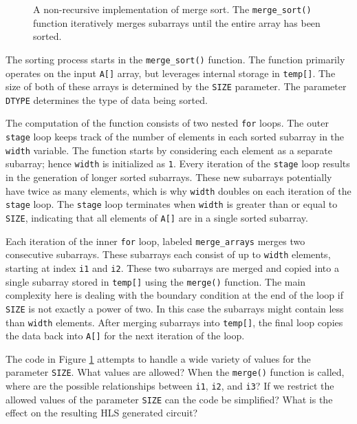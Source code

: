 \begin{figure}

\caption{  A non-recursive implementation of merge sort. The \lstinline{merge_sort()} function iteratively merges subarrays until the entire array has been sorted. }
\label{fig:merge_sort.cpp}
\end{figure}

The sorting process starts in the \lstinline{merge_sort()} function. The function primarily operates on the input \lstinline{A[]} array, but leverages internal storage in \lstinline{temp[]}. The size of both of these arrays is determined by the \lstinline{SIZE} parameter. The parameter \lstinline{DTYPE} determines the type of data being sorted.

The computation of the function consists of two nested \lstinline{for} loops. The outer \lstinline{stage} loop keeps track of the number of elements in each sorted subarray in the \lstinline{width} variable. The function starts by considering each element as a separate subarray; hence \lstinline{width} is initialized as \lstinline{1}. Every iteration of the \lstinline{stage} loop results in the generation of longer sorted subarrays. These new subarrays potentially have twice as many elements, which is why \lstinline{width} doubles on each iteration of the \lstinline{stage} loop. The \lstinline{stage} loop terminates when \lstinline{width} is greater than or equal to \lstinline{SIZE}, indicating that all elements of \lstinline{A[]} are in a single sorted subarray.

Each iteration of the inner \lstinline{for} loop, labeled \lstinline{merge_arrays} merges two consecutive subarrays. These subarrays each consist of up to \lstinline{width} elements, starting at index \lstinline{i1} and \lstinline{i2}.  These two subarrays are merged and copied into a single subarray stored in \lstinline{temp[]} using the \lstinline{merge()} function.  The main complexity here is dealing with the boundary condition at the end of the loop if \lstinline{SIZE} is not exactly a power of two.  In this case the subarrays might contain less than \lstinline{width} elements. After merging subarrays into \lstinline{temp[]}, the final loop copies the data back into \lstinline{A[]} for the next iteration of the loop.

\begin{exercise}
The code in Figure \ref{fig:merge_sort.cpp} attempts to handle a wide variety of values for the parameter \lstinline{SIZE}.  What values are allowed?  When the \lstinline{merge()} function is called, where are the possible relationships between \lstinline{i1}, \lstinline{i2}, and \lstinline{i3}?   If we restrict the allowed values of the parameter \lstinline{SIZE} can the code be simplified?  What is the effect on the resulting HLS generated circuit? 
\end{exercise}

